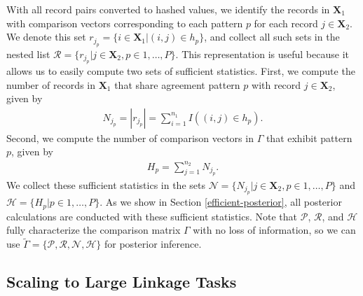 \documentclass[ba]{imsart}
\begin{document}
With all record pairs converted to hashed values, we identify the records in $\bm{X}_1$ with comparison vectors corresponding to each pattern $p$ for each record $j \in \bm{X}_2$. We denote this set $r_{j_p} = \{i \in \bm{X}_1 | (i, j) \in h_p\}$, and collect all such sets in the nested list $\mathcal{R} = \{r_{j_p} | j \in \bm{X}_2, p \in 1, \ldots, P\}$. This representation is useful because it allows us to easily compute two sets of sufficient statistics. First, we compute the number of records in $\bm{X}_1$ that share agreement pattern $p$ with record $j \in \bm{X}_2$, given by
\begin{align}
\label{eqn:N}
N_{j_p} = |r_{j_p}| = \sum_{i=1}^{n_1} I((i, j) \in h_p).
\end{align}
Second, we compute the number of comparison vectors in $\Gamma$ that exhibit pattern $p$, given by
\begin{align}
	\label{eqn:H}
	H_p = \sum_{j = 1}^{n_2} N_{j_p}.
\end{align}
We collect these sufficient statistics in the sets $\mathcal{N} = \{N_{j_p} |j \in \bm{X}_2, p \in 1, \ldots, P \}$ and $\mathcal{H} = \{H_{p} | p \in 1, \ldots, P \}$. As we show in Section \ref{efficient-posterior}, all posterior calculations are conducted with these sufficient statistics. Note that $\mathcal{P}$, $\mathcal{R}$, and $\mathcal{H}$  fully characterize the comparison matrix $\Gamma$ with no loss of information, so we can use $\tilde{\Gamma} = \{\mathcal{P}, \mathcal{R}, \mathcal{N}, \mathcal{H}\}$ for posterior inference. 



\hypertarget{scaling}{%
	\subsection{Scaling to Large Linkage Tasks}\label{scaling}}
\end{document}

